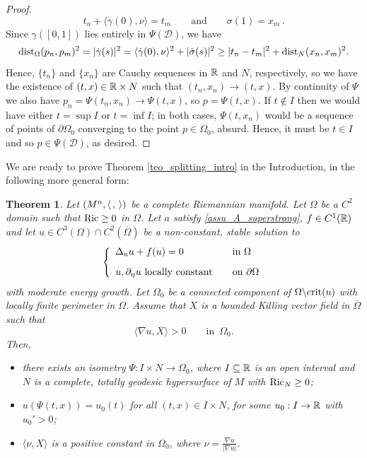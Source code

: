 \documentclass[10 pt,a4paper]{article}
\newtheorem{theorem}[definition]{Theorem}
\theoremstyle{definition}
\begin{document}
\begin{proof}
	\[
		t_n + \langle\dot\gamma(0),\nu\rangle = t_m \qquad \text{and} \qquad \sigma(1) = x_m \, .
	\]
	Since $\gamma([0,1])$ lies entirely in $\Psi(\mathscr D)$, we have
	\[
		\mathrm{dist}_\Omega(p_n,p_m)^2 = |\dot\gamma(s)|^2 = \langle\dot\gamma(0),\nu\rangle^2 + |\dot\sigma(s)|^2 \geq |t_n-t_m|^2 + \mathrm{dist}_N(x_n,x_m)^2 .
	\]
	Hence, $\{t_n\}$ and $\{x_n\}$ are Cauchy sequences in $\mathbb R$ and $N$, respectively, so we have the existence of $(t,x) \in \mathbb R\times N$ such that $(t_n,x_n) \to (t,x)$. By continuity of $\Psi$ we also have $p_n = \Psi(t_n,x_n) \to \Psi(t,x)$, so $p = \Psi(t,x)$. If $t\not\in I$ then we would have either $t = \sup I$ or $t = \inf I$; in both cases, $\Psi(t,x_n)$ would be a sequence of points of $\partial\Omega_0$ converging to the point $p\in\Omega_0$, absurd. Hence, it must be $t\in I$ and so $p\in\Psi(\mathscr D)$, as desired.
\end{proof}

We are ready to prove Theorem \ref{teo_splitting_intro} in the Introduction, in the following more general form: 


\begin{theorem} \label{teo_splitting}
	Let $(M^n, \langle \, , \, \rangle)$ be a complete Riemannian manifold. Let $\Omega$ be a $C^2$ domain such that $\mathrm{Ric}\geq 0$ in $\Omega$. Let $a$ satisfy \eqref{assu_A_superstrong}, $f \in C^1(\mathbb R)$ and let $u \in C^3(\Omega) \cap C^2(\overline\Omega)$ be a non-constant, stable solution to
	\[
	\left\{
	\begin{array}{l@{\qquad}l}
		\Delta_a u + f(u) = 0 & \text{in } \Omega \\[0.3cm]
		u, \partial_\eta u \text{ locally constant} & \text{on } \partial\Omega
	\end{array}
	\right.
	\]
	with moderate energy growth. Let $\Omega_0$ be a connected component of $\Omega\backslash{\rm crit}(u)$ with locally finite perimeter in $\Omega$. Assume that $X$ is a bounded Killing vector field in  $\overline\Omega$ such that
	\begin{equation}\label{eq_monotonoc}
		\langle \nabla u, X \rangle > 0 \qquad \text{in } \, \Omega_0.
	\end{equation}
	Then,
	\begin{itemize}
		\item [i)] there exists an isometry $\Psi : I \times N \to \Omega_0$, where $I\subseteq\mathbb R$ is an open interval and $N$ is a complete, totally geodesic hypersurface of $M$ with $\mathrm{Ric}_N \geq 0$;
		\item [ii)] $u(\Psi(t,x)) = u_0(t)$ for all $(t,x)\in I\times N$, for some $u_0 : I \to \mathbb R$ with $u_0'>0$;
		\item [iii)] $\langle \nu,X \rangle$ is a positive constant in $\Omega_0$, where $\nu = \frac{\nabla u}{|\nabla u|}$.
	\end{itemize}
\end{theorem}
\end{document}
